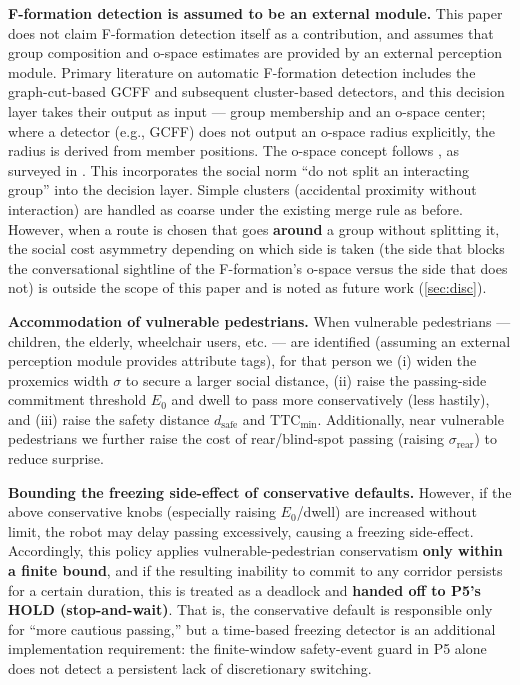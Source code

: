 \noindent\textbf{F-formation detection is assumed to be an external module.} This paper does not claim F-formation detection itself as a contribution, and assumes that group composition and o-space estimates are provided by an external perception module. Primary literature on automatic F-formation detection includes the graph-cut-based GCFF \citep{setti2015gcff} and subsequent cluster-based detectors, and this decision layer takes their output as input --- group membership and an o-space center; where a detector (e.g., GCFF) does not output an o-space radius explicitly, the radius is derived from member positions. The o-space concept follows \citep{kendon1990conducting}, as surveyed in \citep{riosmartinez2015survey}. This incorporates the social norm ``do not split an interacting group'' into the decision layer. Simple clusters (accidental proximity without interaction) are handled as coarse  under the existing merge rule as before. However, when a route is chosen that goes \textbf{around} a group without splitting it, the social cost asymmetry depending on which side is taken (the side that blocks the conversational sightline of the F-formation's o-space versus the side that does not) is outside the scope of this paper and is noted as future work (\cref{sec:disc}).

\noindent\textbf{Accommodation of vulnerable pedestrians.} When vulnerable pedestrians --- children, the elderly, wheelchair users, etc. --- are identified (assuming an external perception module provides attribute tags), for that person we (i) widen the proxemics width $\sigma$ to secure a larger social distance, (ii) raise the passing-side commitment threshold $E_0$ and dwell to pass more conservatively (less hastily), and (iii) raise the safety distance $d_{\text{safe}}$ and $\text{TTC}_{\min}$. Additionally, near vulnerable pedestrians we further raise the cost of rear/blind-spot passing (raising $\sigma_{\text{rear}}$) to reduce surprise.

\noindent\textbf{Bounding the freezing side-effect of conservative defaults.} However, if the above conservative knobs (especially raising $E_0$/dwell) are increased without limit, the robot may delay passing excessively, causing a freezing side-effect. Accordingly, this policy applies vulnerable-pedestrian conservatism \textbf{only within a finite bound}, and if the resulting inability to commit to any corridor persists for a certain duration, this is treated as a deadlock and \textbf{handed off to P5's HOLD (stop-and-wait)}. That is, the conservative default is responsible only for ``more cautious passing,'' but a time-based freezing detector is an additional implementation requirement: the finite-window safety-event guard in P5 alone does not detect a persistent lack of discretionary switching.

